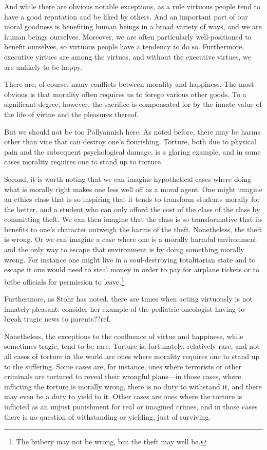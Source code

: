 And while there are obvious notable exceptions, as a rule virtuous people tend to have a good reputation and be liked
by others. And an important part of our moral goodness is benefiting human beings in a broad variety of ways, and we 
are human beings ourselves. Moreover, we are often particularly well-positioned to benefit ourselves, so virtuous people
have a tendency to do so. Furthermore, executive virtues are among the virtues, and without the executive virtues, we are 
unlikely to be happy.

There are, of course, many conflicts between morality and happiness. The most obvious is that morality often requires
us to forego various other goods. To a significant degree, however, the sacrifice is compensated for by the innate value
of the life of virtue and the pleasures thereof. 

But we should not be too Pollyannish here. As noted before, there may 
be harms other than vice that can destroy one's flourishing. Torture, both due to physical pain and the subsequent 
psychological damage, is a glaring example, and in some cases morality requires one to stand up to torture. 

Second, it is worth noting that we can imagine hypothetical cases where doing what is morally right makes one less 
well off as a moral agent. One might imagine an ethics class that is so inspiring that it tends to 
transform students morally for the better, and a student who can only afford the cost of the class of the class by 
committing theft. We can then imagine that the class is so transformative that its benefits to one's character outweigh
the harms of the theft. Nonetheless, the theft is wrong. Or we can imagine a case where one is a morally harmful 
environment and the only way to escape that environment is by doing something morally wrong. For instance one might 
live in a soul-destroying totalitarian state and to escape it one would need to steal money in order to pay for airplane 
tickets or to bribe officials for permission to leave.\footnote{The bribery may not be wrong, but the theft may well be.}

Furthermore, as Stohr has noted, there are times when acting virtuously is not innately pleasant: consider her 
example of the pediatric oncologist having to break tragic news to parents??ref. 

Nonetheless, the exceptions to the confluence of virtue and happiness, while sometimes tragic, tend to be rare. 
Torture is, fortunately, relatively rare, and not all cases of torture in the world are ones where morality requires 
one to stand up to the suffering. Some cases are, for instance, ones where terrorists or other criminals are tortured
to reveal their wrongful plans---in those cases, where inflicting the torture is morally wrong, there is no duty to 
withstand it, and there may even be a duty to yield to it. Other cases are ones where the torture is inflicted 
as an unjust punishment for real or imagined crimes, and in those cases there is no question of withstanding or 
yielding, just of surviving.

